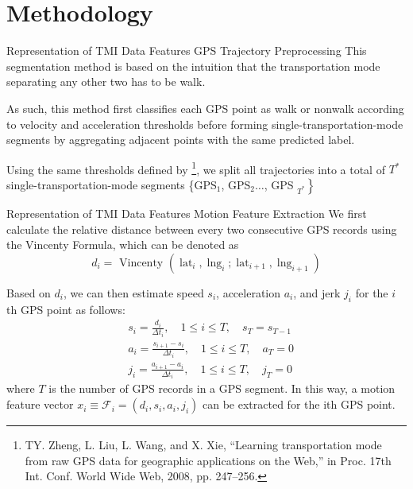 \documentclass[UTF8]{beamer}
\begin{document}
\section{Methodology}
\begin{frame}
{Representation of TMI Data Features}
{GPS Trajectory Preprocessing}
This segmentation method is based on the intuition that \alert{the transportation mode separating any other two has to be walk.}


As such, this method first classifies each GPS point as walk or nonwalk according to velocity and acceleration thresholds before forming single-transportation-mode segments by aggregating adjacent points with the same predicted label. 

Using the same thresholds defined by \footnote{TY. Zheng, L. Liu, L. Wang, and X. Xie, “Learning transportation mode from raw GPS data for geographic applications on the Web,” in Proc. 17th Int. Conf. World Wide Web, 2008, pp. 247–256.}, we split all trajectories into a total of $T^*$ single-transportation-mode segments \{GPS$_1$, GPS$_2 \ldots$, GPS $\left._{T^*}\right\}$


\end{frame}



\begin{frame}
{Representation of TMI Data Features}
{Motion Feature Extraction}
We first calculate the relative distance between every two consecutive GPS records using the Vincenty Formula, which can be denoted as
$$
d_i=\text { Vincenty }\left(\operatorname{lat}_i, \operatorname{lng}_i ; \operatorname{lat}_{i+1}, \operatorname{lng}_{i+1}\right)
$$

Based on $d_i$, we can then estimate speed $s_i$, acceleration $a_i$, and jerk $j_i$ for the $i$ th GPS point as follows:
$$
\begin{aligned}
&s_i=\frac{d_i}{\Delta t_i}, \quad 1 \leq i \leq T, \quad s_T=s_{T-1} \\
&a_i=\frac{s_{i+1}-s_i}{\Delta t_i}, \quad 1 \leq i \leq T, \quad a_T=0 \\
&j_i=\frac{a_{i+1}-a_i}{\Delta t_i}, \quad 1 \leq i \leq T, \quad j_T=0
\end{aligned}
$$
where $T$ is the number of GPS records in a GPS segment. In this way, a motion feature vector $x_i \equiv \mathcal{F}_i=\left(d_i, s_i, a_i, j_i\right)$ can be extracted for the ith GPS point. 
\end{frame}
\end{document}
